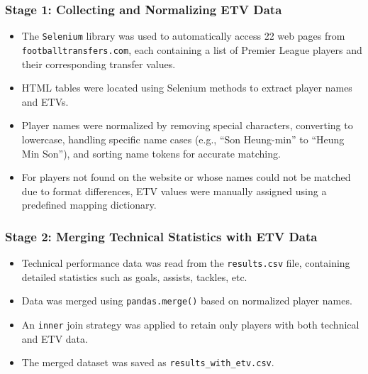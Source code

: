\documentclass[12pt,a4paper]{article}
\begin{document}
\subsubsection{Stage 1: Collecting and Normalizing ETV Data}
\begin{itemize}
    \item The \texttt{Selenium} library was used to automatically access 22 web pages from \texttt{footballtransfers.com}, each containing a list of Premier League players and their corresponding transfer values.
    \item HTML tables were located using Selenium methods to extract player names and ETVs.
    \item Player names were normalized by removing special characters, converting to lowercase, handling specific name cases (e.g., ``Son Heung-min'' to ``Heung Min Son''), and sorting name tokens for accurate matching.
    \item For players not found on the website or whose names could not be matched due to format differences, ETV values were manually assigned using a predefined mapping dictionary.
\end{itemize}

\subsubsection{Stage 2: Merging Technical Statistics with ETV Data}
\begin{itemize}
    \item Technical performance data was read from the \texttt{results.csv} file, containing detailed statistics such as goals, assists, tackles, etc.
    \item Data was merged using \texttt{pandas.merge()} based on normalized player names.
    \item An \texttt{inner} join strategy was applied to retain only players with both technical and ETV data.
    \item The merged dataset was saved as \texttt{results\_with\_etv.csv}.
\end{itemize}
\end{document}
